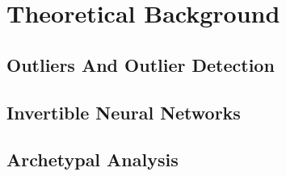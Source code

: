 \chapter{Theoretical Background}%
\label{cha:background}


\section{Outliers And Outlier Detection}%
\label{sec:outliers_an_outlier_detection}


\section{Invertible Neural Networks}%
\label{sec:invertible_neural_networks}


\section{Archetypal Analysis}%
\label{sec:archetypal_analysis}
